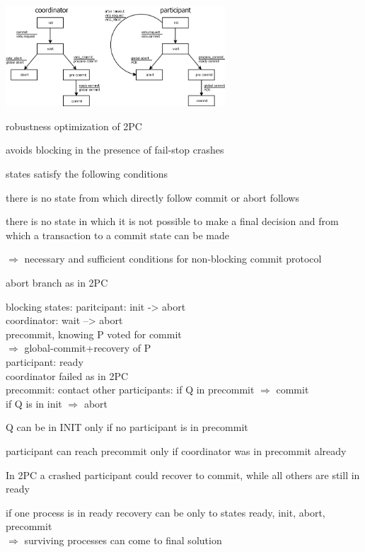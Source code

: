 \begin{minipage}{\linewidth}
	\centering\includegraphics[width=310px]{gfx/3pc.png}
	\label{img:3pc}
\end{minipage}

\begin{compactitem}
	\item robustness optimization of 2PC
	\item avoids blocking in the presence of fail-stop crashes
	\item states satisfy the following conditions
	\begin{compactenum}
		\item there is no state from which directly follow commit or abort follows
		\item there is no state in which it is not possible to make a final decision and from which a transaction to a commit state can be made
	\end{compactenum}
	\item $\Rightarrow$ necessary and sufficient conditions for non-blocking commit protocol
	\item abort branch as in 2PC
	\item blocking states: paritcipant: init -> abort\\
	coordinator: wait --> abort\\
	precommit, knowing P voted for commit\\
	$\Rightarrow$ global-commit+recovery of P\\
	participant: ready\\
		coordinator failed as in 2PC\\
		precommit: contact other participants: if Q in precommit $\Rightarrow$ commit\\
		if Q is in init $\Rightarrow$ abort
	\item Q can be in INIT only if no participant is in precommit
	\item participant can reach precommit only if coordinator was in precommit already
	\item In 2PC a crashed participant could recover to commit, while all others are still in ready
	\item if one process is in ready recovery can be only to states ready, init, abort, precommit\\
	$\Rightarrow$ surviving processes can come to final solution
	\end{compactitem}
	
